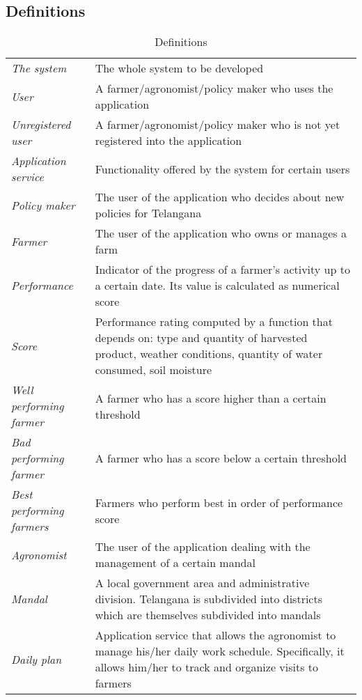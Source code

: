 \subsection{Definitions}
\begin{center}
\setlength\tabcolsep{7pt}
\renewcommand{\arraystretch}{2}
\begin{longtable}{|m{3.2cm}|m{8.3cm}|}
\caption{Definitions}\\
\hline
\endfirsthead
\endhead
\hline
\endlastfoot
\hline
\textit{The system} & The whole system to be developed \\
\textit{User} & A farmer/agronomist/policy maker who uses the application\\
\textit{Unregistered user} & A farmer/agronomist/policy maker who is not yet registered into the application\\
\textit{Application service} & Functionality offered by the system for certain users \\
\textit{Policy maker} & The user of the application who decides about new policies for Telangana \\
\textit{Farmer} & The user of the application who owns or manages a farm\\
\textit{Performance} & Indicator of the progress of a farmer's activity up to a certain date. Its value is calculated as numerical score \\
\textit{Score} & Performance rating computed by a function that depends on: type and quantity of harvested product, weather conditions, quantity of water consumed, soil moisture\\
\textit{Well performing farmer} & A farmer who has a score higher than a certain threshold\\
\textit{Bad performing farmer} & A farmer who has a score below a certain threshold\\
\textit{Best performing farmers} & Farmers who perform best in order of performance score\\
\textit{Agronomist} & The user of the application dealing with the management of a certain mandal\\
\textit{Mandal} & A local government area and  administrative division. Telangana is subdivided into districts which are themselves subdivided into mandals\\
\textit{Daily plan} & Application service that allows the agronomist to manage his/her daily work schedule. Specifically, it allows him/her to track and organize visits to farmers\\

\end{longtable}
\end{center}
